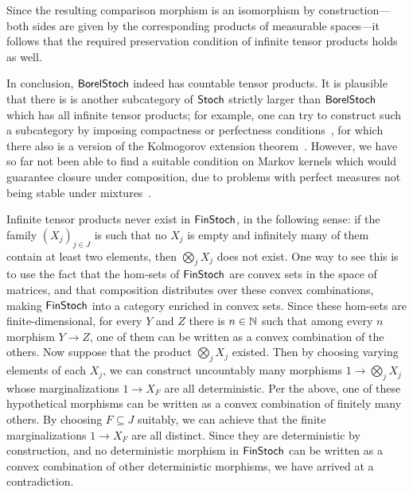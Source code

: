 \documentclass[11pt]{article}
\begin{document}
\begin{example}
	Since the resulting comparison morphism  is an isomorphism by construction---both sides are given by the corresponding products of measurable spaces---it follows that the required preservation condition of infinite tensor products holds as well.

	In conclusion, $\operatorname{\mathsf{BorelStoch}}$ indeed has countable tensor products. It is plausible that there is is another subcategory of $\operatorname{\mathsf{Stoch}}$ strictly larger than $\operatorname{\mathsf{BorelStoch}}$ which has all infinite tensor products; for example, one can try to construct such a subcategory by imposing compactness or perfectness conditions~\cite[\S{451}]{fremlin4}, for which there also is a version of the Kolmogorov extension theorem~\cite[Corollary~454G]{fremlin4}. However, we have so far not been able to find a suitable condition on Markov kernels which would guarantee closure under composition, due to problems with perfect measures not being stable under mixtures~\cite{ramachandran}.
\end{example}

\begin{example}
	\label{infprods_finstoch}
	Infinite tensor products never exist in $\operatorname{\mathsf{FinStoch}}$, in the following sense: if the family $(X_j)_{j \in J}$ is such that no $X_j$ is empty and infinitely many of them contain at least two elements, then $\bigotimes_j X_j$ does not exist. One way to see this is to use the fact that the hom-sets of $\operatorname{\mathsf{FinStoch}}$ are convex sets in the space of matrices, and that composition distributes over these convex combinations, making $\operatorname{\mathsf{FinStoch}}$ into a category enriched in convex sets. Since these hom-sets are finite-dimensional, for every $Y$ and $Z$ there is $n \in \mathbb{N}$ such that among every $n$ morphism $Y \to Z$, one of them can be written as a convex combination of the others. Now suppose that the product $\bigotimes_j X_j$ existed. Then by choosing varying elements of each $X_j$, we can construct uncountably many morphisms $1 \to \bigotimes_j X_j$ whose marginalizations $1 \to X_F$ are all deterministic. Per the above, one of these hypothetical morphisms can be written as a convex combination of finitely many others. By choosing $F \subseteq J$ suitably, we can achieve that the finite marginalizations $1 \to X_F$ are all distinct. Since they are deterministic by construction, and no deterministic morphism in $\operatorname{\mathsf{FinStoch}}$ can be written as a convex combination of other deterministic morphisms, we have arrived at a contradiction.
\end{example}
\end{document}
